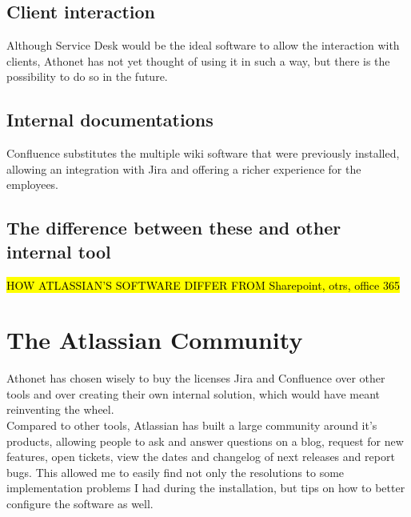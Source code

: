 	\subsection{Client interaction} 
		Although Service Desk would be the ideal software to allow the interaction with clients, Athonet has not yet thought of using it in such a way, but there is the possibility to do so in the future.
		
	\subsection{Internal documentations}
		Confluence substitutes the multiple wiki software that were previously installed, allowing an integration with Jira and offering a richer experience for the employees.
		
	\subsection{The difference between these and other internal tool}
		\hl{HOW ATLASSIAN'S SOFTWARE DIFFER FROM Sharepoint, otrs, office 365}

\section{The Atlassian Community}
	Athonet has chosen wisely to buy the licenses Jira and Confluence over other tools and over creating their own internal solution, which would have meant reinventing the wheel.\\
	Compared to other tools, Atlassian has built a large community around it's products, allowing people to ask and answer questions on a blog, request for new features, open tickets, view the dates and changelog of next releases and report bugs.
	This allowed me to easily find not only the resolutions to some implementation problems I had during the installation, but tips on how to better configure the software as well.

